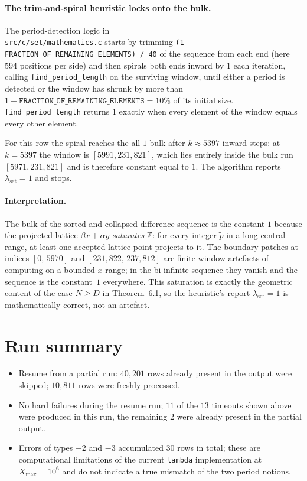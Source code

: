 \documentclass[11pt]{article}
\begin{document}
\paragraph{The trim-and-spiral heuristic locks onto the bulk.}
The period-detection logic in \\ \texttt{src/c/set/mathematics.c} starts by
trimming \texttt{(1 - FRACTION\_OF\_REMAINING\_ELEMENTS) / 40} of the
sequence from each end (here $594$ positions per side) and then spirals
both ends inward by $1$ each iteration, calling
\texttt{find\_period\_length} on the surviving window, until either a
period is detected or the window has shrunk by more than
$1 - \texttt{FRACTION\_OF\_REMAINING\_ELEMENTS} = 10\%$ of its initial
size. \texttt{find\_period\_length} returns $1$ exactly when every
element of the window equals every other element.

For this row the spiral reaches the all-$1$ bulk after $k \approx 5397$
inward steps: at $k = 5397$ the window is $[5991, 231{,}821]$, which lies
entirely inside the bulk run $[5971, 231{,}821]$ and is therefore
constant equal to $1$. The algorithm reports $\lambda_{\text{set}} = 1$
and stops.

\paragraph{Interpretation.}
The bulk of the sorted-and-collapsed difference sequence is the constant
$1$ because the projected lattice $\beta x + \alpha y$ \emph{saturates}
$\mathbb{Z}$: for every integer $\tilde p$ in a long central range, at
least one accepted lattice point projects to it. The boundary patches
at indices $[0,\,5970]$ and $[231{,}822,\,237{,}812]$ are finite-window
artefacts of computing on a bounded $x$-range; in the bi-infinite
sequence they vanish and the sequence is the constant~$1$ everywhere.
This saturation is exactly the geometric content of the case
$N \ge D$ in Theorem~6.1, so the heuristic's
report $\lambda_{\text{set}} = 1$ is mathematically correct, not an
artefact.

\section*{Run summary}

\begin{itemize}
\item Resume from a partial run: $40{,}201$ rows already present in the
      output were skipped; $10{,}811$ rows were freshly processed.
\item No hard failures during the resume run; $11$ of the $13$ timeouts
      shown above were produced in this run, the remaining $2$ were
      already present in the partial output.
\item Errors of types $-2$ and $-3$ accumulated $30$ rows in total;
      these are computational limitations of the current
      \texttt{lambda} implementation at $X_{\max}=10^{6}$ and do not
      indicate a true mismatch of the two period notions.
\end{itemize}
\end{document}
